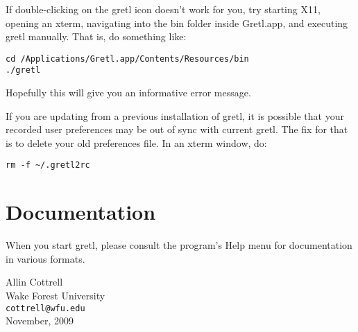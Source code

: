\documentclass[11pt]{article}
\begin{document}
If double-clicking on the gretl icon doesn't work for you, try
starting X11, opening an xterm, navigating into the \textsf{bin}
folder inside \textsf{Gretl.app}, and executing 
\textsf{gretl} manually.  That is, do something like:

\begin{verbatim}
cd /Applications/Gretl.app/Contents/Resources/bin
./gretl
\end{verbatim}

Hopefully this will give you an informative error message.

If you are updating from a previous installation of gretl, it
is possible that your recorded user preferences may be out of
sync with current gretl.  The fix for that is to delete
your old preferences file.  In an xterm window, do:

\begin{verbatim}
rm -f ~/.gretl2rc
\end{verbatim}

\section{Documentation}
\label{sec:doc}

When you start gretl, please consult the program's Help menu for
documentation in various formats.

\vspace{.25in}

\raggedright
Allin Cottrell \\
Wake Forest University \\
\texttt{cottrell@wfu.edu} \\
November, 2009
\end{document}

